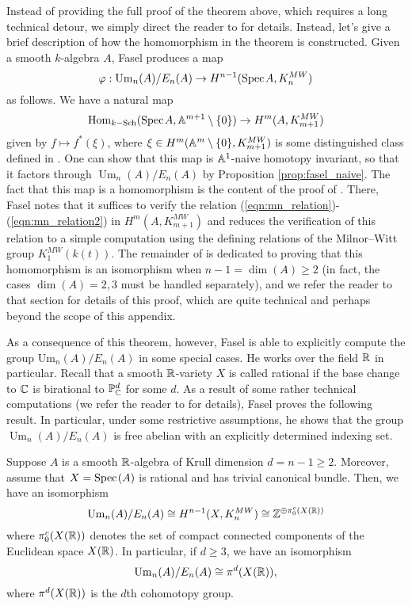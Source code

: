 Instead of providing the full proof of the theorem above, which requires a long technical detour, we simply direct the reader to \cite[Section 4]{Fasel-unim} for details. Instead, let's give a brief description of how the homomorphism in the theorem is constructed. Given a smooth $k$-algebra $A$, Fasel produces a map
\[
\varphi: \mathrm{Um}_n(A)/E_n(A) \to H^{n-1}(\text{Spec}\hspace{0.1em} A,K_{n}^{MW})
\]
as follows. We have a natural map
\[
\mathrm{Hom}_{k\mathrm{-Sch}}(\text{Spec}\hspace{0.1em} A, \mathbb{A}^{m+1} \setminus\{0\}) \to H^{m}(A,K_{m+1}^{MW})
\]
given by $f \mapsto f^*(\xi)$, where $\xi \in H^{m}(\mathbb{A}^m\setminus\{0\},K_{m+1}^{MW})$ is some distinguished class defined in \cite[Section 3]{Fasel-unim}. One can show that this map is $\mathbb{A}^1$-naive homotopy invariant, so that it factors through $\operatorname{Um}_n(A)/E_n(A)$ by Proposition \ref{prop:fasel_naive}. The fact that this map is a homomorphism is the content of the proof of \cite[Theorem 4.1]{Fasel-unim}. There, Fasel notes that it suffices to verify the relation (\ref{eqn:mn_relation})-(\ref{eqn:mn_relation2}) in $H^{m}(A,K_{m+1}^{MW})$ and reduces the verification of this relation to a simple computation using the defining relations of the Milnor--Witt group $K_1^{MW}(k(t))$. The remainder of \cite[Section 4]{Fasel-unim} is dedicated to proving that this homomorphism is an isomorphism when $n-1 = \dim(A) \geq 2$ (in fact, the cases $\dim(A) = 2,3$ must be handled separately), and we refer the reader to that section for details of this proof, which are quite technical and perhaps beyond the scope of this appendix.

As a consequence of this theorem, however, Fasel is able to explicitly compute the group $\mathrm{Um}_n(A)/E_n(A)$ in some special cases. He works over the field $\mathbb{R}$ in particular. Recall that a smooth $\mathbb{R}$-variety $X$ is called rational if the base change to $\mathbb{C}$ is birational to $\mathbb{P}_{\mathbb{C}}^d$ for some $d$. As a result of some rather technical computations (we refer the reader to \cite[Section 5]{Fasel-unim} for details), Fasel proves the following result. In particular, under some restrictive assumptions, he shows that the group $\operatorname{Um}_n(A)/E_n(A)$ is free abelian with an explicitly determined indexing set.

\begin{theorem}\cite[Theorem 5.7, Remark 5.8]{Fasel-unim}\label{thm:fasel_explicit_group}
    Suppose $A$ is a smooth $\mathbb{R}$-algebra of Krull dimension $d = n-1 \geq 2$. Moreover, assume that $X = \text{Spec}\hspace{0.1em}(A)$ is rational and has trivial canonical bundle. Then, we have an isomorphism
    \[
    \operatorname{Um}_n(A)/E_n(A) \cong H^{n-1}(X, K_{n}^{MW}) \cong \mathbb{Z}^{\oplus \pi_0^c(X(\mathbb{R}))}
    \]
    where $\pi_0^c(X(\mathbb{R}))$ denotes the set of compact connected components of the Euclidean space $X(\mathbb{R})$. In particular, if $d \geq 3$, we have an isomorphism
    \[
    \operatorname{Um}_n(A)/E_n(A) \cong \pi^d(X(\mathbb{R})),
    \]
    where $\pi^d(X(\mathbb{R}))$ is the $d$th cohomotopy group.
\end{theorem}

